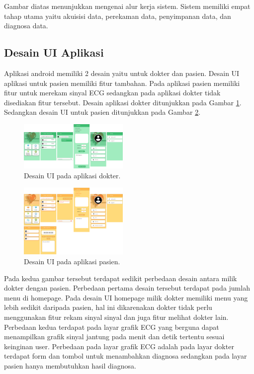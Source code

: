 \documentclass[conference]{IEEEtran}
\begin{document}
	Gambar diatas menunjukkan mengenai alur kerja sistem. Sistem memiliki empat tahap utama yaitu akuisisi data, perekaman data, penyimpanan data, dan diagnosa data.
	
	\vspace{1ex}
	
	
	

	
	
	\subsection{Desain UI Aplikasi}
	\vspace{1ex}
	Aplikasi android memiliki 2 desain yaitu untuk dokter dan
	pasien. Desain UI aplikasi untuk pasien memiliki fitur tambahan. Pada aplikasi pasien memiliki fitur untuk merekam sinyal
	ECG sedangkan pada aplikasi dokter tidak disediakan fitur tersebut. Desain aplikasi dokter
	ditunjukkan pada Gambar \ref{fig:3.2}. Sedangkan desain UI untuk pasien ditunjukkan pada Gambar \ref{fig:3.3}. 
	
	\begin{figure}[!ht] \centering
		\includegraphics[width=0.47\textwidth]{img/dokterUI.png}
		\caption{Desain UI pada aplikasi dokter.}
		\label{fig:3.2}
	\end{figure}
	\begin{figure}[!ht] \centering
		\includegraphics[width=0.47\textwidth]{img/pasienUI.png}
		\caption{Desain UI pada aplikasi pasien.}
		\label{fig:3.3}
	\end{figure}
	\vspace{1ex}
	Pada kedua gambar tersebut terdapat
	sedikit perbedaan desain antara milik dokter dengan pasien. Perbedaan pertama desain tersebut terdapat pada jumlah menu di homepage. Pada desain UI homepage milik dokter memiliki menu yang lebih sedikit daripada pasien, hal ini dikarenakan dokter tidak perlu menggunakan fitur rekam sinyal sinyal dan juga fitur melihat dokter lain. Perbedaan kedua terdapat
	pada layar grafik ECG yang berguna dapat menampilkan grafik sinyal jantung pada menit dan detik tertentu sesuai keinginan user.
	Perbedaan pada layar grafik ECG adalah pada layar dokter
	terdapat form dan tombol untuk menambahkan diagnosa sedangkan pada layar pasien hanya membutuhkan hasil diagnosa.
	
\end{document}
